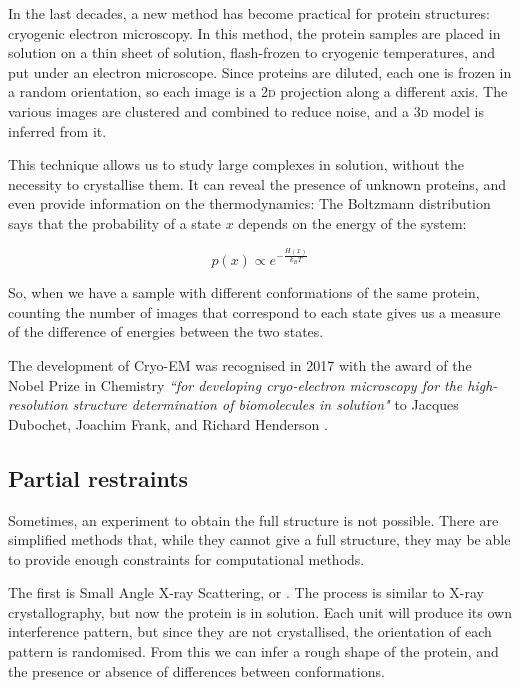 In the last decades, 
a new method has become practical for protein structures: cryogenic electron microscopy.
In this method, the protein samples are placed in solution on a thin sheet of solution, flash-frozen to cryogenic temperatures, and put under an electron microscope.
Since proteins are diluted, each one is frozen in a random orientation, so each image is a \textsc{2d} projection along a different axis.
The various images are clustered and combined to reduce noise, and a \textsc{3d} model is inferred from it.

This technique allows us to study large complexes in solution, without the necessity to crystallise them.
It can reveal the presence of unknown proteins, and even provide information on the thermodynamics:
The Boltzmann distribution says that the probability of a state $x$ depends on the energy of the system:

\begin{equation*}
p(x) \propto e^{-\frac{H(x)}{k_B T}}
\end{equation*}

So, when we have a sample with different conformations of the same protein, counting the number of images that correspond to each state gives us a measure of the difference of energies between the two states.

The development of Cryo-EM was recognised in 2017 with the award of the Nobel Prize in Chemistry \emph{``for developing cryo-electron microscopy for the high-resolution structure determination of biomolecules in solution"} to Jacques Dubochet, Joachim Frank, and Richard Henderson  \citep{cryoEM_nobel}.


\subsection{Partial restraints}
Sometimes, an experiment to obtain the full structure is not possible.
There are simplified methods that, while they cannot give a full structure, they may be able to provide enough constraints for computational methods.

The first is Small Angle X-ray Scattering, or \SAXS. \sidenote{\SAXS}
The process is similar to X-ray crystallography, but now the protein is in solution.
Each unit will produce its own interference pattern, but since they are not crystallised, the orientation of each pattern is randomised.
From this we can infer a rough shape of the protein, and the presence or absence of differences between conformations.

